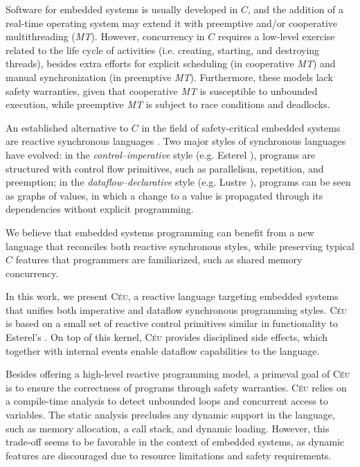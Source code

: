 \documentclass{sigplan-proc}
\newcommand{\2}{\;\;}
\newcommand{\5}{\;\;\;\;\;}
\newcommand{\CEU}{\textsc{C\'{e}u}}
\begin{document}
Software for embedded systems is usually developed in $C$, and the addition of 
a real-time operating system may extend it with preemptive and/or cooperative 
multithreading (\emph{MT}).
However, concurrency in $C$ requires a low-level exercise related to the life 
cycle of activities (i.e. creating, starting, and destroying threads), besides 
extra efforts for explicit scheduling (in cooperative \emph{MT}) and manual
synchronization (in preemptive \emph{MT}).
Furthermore, these models lack safety warranties, given that 
cooperative \emph{MT} is susceptible to unbounded execution, while 
preemptive \emph{MT} is subject to race conditions and deadlocks.

An established alternative to $C$ in the field of safety-critical embedded 
systems are reactive synchronous languages \cite{rp.twelve}.
Two major styles of synchronous languages have evolved:
in the \emph{control}--\emph{imperative} style (e.g. Esterel 
\cite{esterel.design}), programs are structured with control flow primitives, 
such as parallelism, repetition, and preemption;
in the \emph{dataflow}--\emph{declarative} style (e.g. Lustre 
\cite{lustre.ieee91}), programs can be seen as graphs of values, in which a 
change to a value is propagated through its dependencies without explicit 
programming.

We believe that embedded systems programming can benefit from a new language 
that reconciles both reactive synchronous styles, while preserving typical $C$ 
features that programmers are familiarized, such as shared memory concurrency.

In this work, we present \CEU, a reactive language targeting embedded systems 
that unifies both imperative and dataflow synchronous programming styles.
\CEU{} is based on a small set of reactive control primitives similar in 
functionality to Esterel's \cite{esterel.design}.
On top of this kernel, \CEU{} provides disciplined side effects, which together 
with internal events enable dataflow capabilities to the language.

Besides offering a high-level reactive programming model, a primeval goal of 
\CEU{} is to ensure the correctness of programs through safety warranties.
\CEU{} relies on a compile-time analysis to detect unbounded loops and 
concurrent access to variables.
The static analysis precludes any dynamic support in the language, such as 
memory allocation, a call stack, and dynamic loading.
However, this trade-off seems to be favorable in the context of embedded 
systems, as dynamic features are discouraged due to resource limitations and 
safety requirements.
\end{document}
